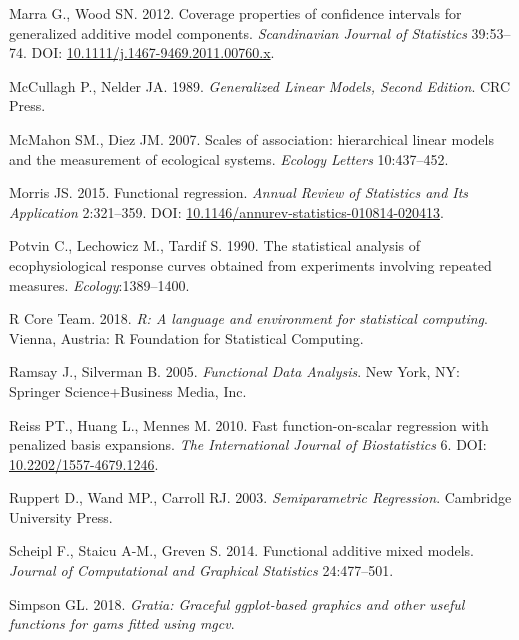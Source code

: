 \documentclass[12pt]{article}
\begin{document}
\hypertarget{ref-marra_coverage_2012}{}
Marra G., Wood SN. 2012. Coverage properties of confidence intervals for
generalized additive model components. \emph{Scandinavian Journal of
Statistics} 39:53--74. DOI:
\href{https://doi.org/10.1111/j.1467-9469.2011.00760.x}{10.1111/j.1467-9469.2011.00760.x}.

\hypertarget{ref-McCullagh:1989ti}{}
McCullagh P., Nelder JA. 1989. \emph{Generalized Linear Models, Second
Edition}. CRC Press.

\hypertarget{ref-McMahon:2007ju}{}
McMahon SM., Diez JM. 2007. Scales of association: hierarchical linear
models and the measurement of ecological systems. \emph{Ecology Letters}
10:437--452.

\hypertarget{ref-morris_functional_2015}{}
Morris JS. 2015. Functional regression. \emph{Annual Review of
Statistics and Its Application} 2:321--359. DOI:
\href{https://doi.org/10.1146/annurev-statistics-010814-020413}{10.1146/annurev-statistics-010814-020413}.

\hypertarget{ref-potvin_statistical_1990}{}
Potvin C., Lechowicz M., Tardif S. 1990. The statistical analysis of
ecophysiological response curves obtained from experiments involving
repeated measures. \emph{Ecology}:1389--1400.

\hypertarget{ref-r_core_2018}{}
R Core Team. 2018. \emph{R: A language and environment for statistical
computing}. Vienna, Austria: R Foundation for Statistical Computing.

\hypertarget{ref-ramsay_functional_2005}{}
Ramsay J., Silverman B. 2005. \emph{Functional Data Analysis}. New York,
NY: Springer Science+Business Media, Inc.

\hypertarget{ref-reiss_fast_2010}{}
Reiss PT., Huang L., Mennes M. 2010. Fast function-on-scalar regression
with penalized basis expansions. \emph{The International Journal of
Biostatistics} 6. DOI:
\href{https://doi.org/10.2202/1557-4679.1246}{10.2202/1557-4679.1246}.

\hypertarget{ref-Ruppert:2003uc}{}
Ruppert D., Wand MP., Carroll RJ. 2003. \emph{Semiparametric
Regression}. Cambridge University Press.

\hypertarget{ref-scheipl_functional_2014}{}
Scheipl F., Staicu A-M., Greven S. 2014. Functional additive mixed
models. \emph{Journal of Computational and Graphical Statistics}
24:477--501.

\hypertarget{ref-simpson_gratia_2018}{}
Simpson GL. 2018. \emph{Gratia: Graceful ggplot-based graphics and other
useful functions for gams fitted using mgcv}.
\end{document}
